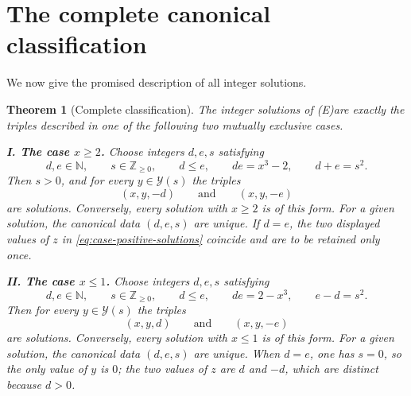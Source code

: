 \documentclass[11pt,a4paper]{article}
\newtheorem{theorem}{Theorem}[section]
\theoremstyle{definition}
\theoremstyle{remark}
\newcommand{\Z}{\mathbb Z}
\newcommand{\N}{\mathbb N}
\newcommand{\Yset}{\mathcal Y}
\newcommand{\eqE}{\textup{(E)}}
\begin{document}
\section{The complete canonical classification}

We now give the promised description of all integer solutions.

\begin{theorem}[Complete classification]\label{thm:classification}
The integer solutions of \eqE are exactly the triples described in
one of the following two mutually exclusive cases.

\medskip
\noindent\textup{\textbf{I. The case $x\geq2$.}}
Choose integers $d,e,s$ satisfying
\begin{equation}
 d,e\in\N,
 \qquad
 s\in\Z_{\geq0},
 \qquad
 d\leq e,
 \qquad
 de=x^3-2,
 \qquad
 d+e=s^2.
 \label{eq:case-positive-data}
\end{equation}
Then $s>0$, and for every $y\in\Yset(s)$ the triples
\begin{equation}
 (x,y,-d)
 \qquad\text{and}\qquad
 (x,y,-e)
 \label{eq:case-positive-solutions}
\end{equation}
are solutions.  Conversely, every solution with $x\geq2$ is of this form.
For a given solution, the canonical data $(d,e,s)$ are unique.  If $d=e$,
the two displayed values of $z$ in \eqref{eq:case-positive-solutions}
coincide and are to be retained only once.

\medskip
\noindent\textup{\textbf{II. The case $x\leq1$.}}
Choose integers $d,e,s$ satisfying
\begin{equation}
 d,e\in\N,
 \qquad
 s\in\Z_{\geq0},
 \qquad
 d\leq e,
 \qquad
 de=2-x^3,
 \qquad
 e-d=s^2.
 \label{eq:case-negative-data}
\end{equation}
Then for every $y\in\Yset(s)$ the triples
\begin{equation}
 (x,y,d)
 \qquad\text{and}\qquad
 (x,y,-e)
 \label{eq:case-negative-solutions}
\end{equation}
are solutions.  Conversely, every solution with $x\leq1$ is of this form.
For a given solution, the canonical data $(d,e,s)$ are unique.  When $d=e$,
one has $s=0$, so the only value of $y$ is $0$; the two values of $z$ are
$d$ and $-d$, which are distinct because $d>0$.
\end{theorem}
\end{document}
